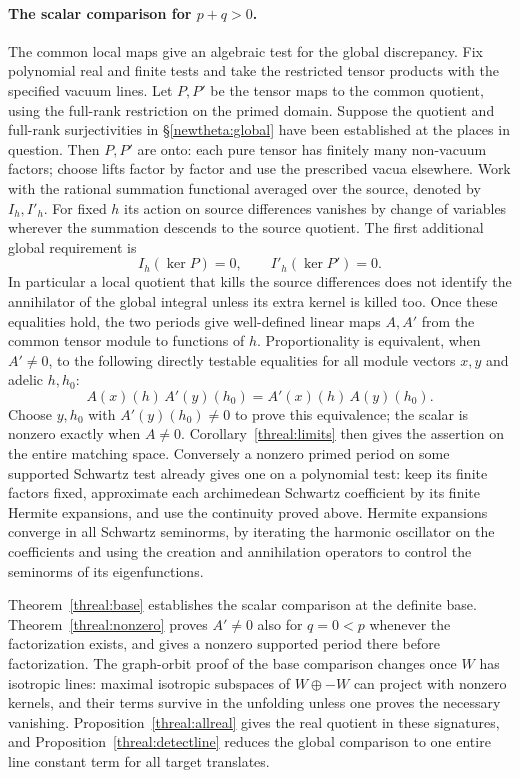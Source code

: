 \paragraph{The scalar comparison for \(p+q>0\).}
The common local maps give an algebraic test for the
global discrepancy. Fix polynomial real and finite tests and take the
restricted tensor products with the specified vacuum lines. Let
\(P,P'\) be the tensor maps to the common quotient, using the
full-rank restriction on the primed domain. Suppose the quotient
and full-rank surjectivities in \S\ref{newtheta:global} have been
established at the places in question. Then \(P,P'\) are onto:
each pure tensor has finitely many non-vacuum factors; choose lifts
factor by factor and use the prescribed vacua elsewhere. Work with
the rational summation functional averaged over the source, denoted
by \(I_h,I'_h\). For fixed \(h\) its action on source differences
vanishes by change of variables wherever the summation descends to
the source quotient. The first additional global requirement is
\[
            I_h(\ker P)=0,\qquad I'_h(\ker P')=0 .
\]
In particular a local quotient that kills the source differences
does not identify the annihilator of the global integral unless its
extra kernel is killed too. Once these equalities hold, the two
periods give well-defined linear maps \(A,A'\) from the common tensor
module to functions of \(h\). Proportionality is equivalent, when
\(A'\ne0\), to the following directly testable equalities for all
module vectors \(x,y\) and adelic \(h,h_0\):
\[
                   A(x)(h)\,A'(y)(h_0)
                    =A'(x)(h)\,A(y)(h_0).
\]
Choose \(y,h_0\) with \(A'(y)(h_0)\ne0\) to prove this equivalence;
the scalar is nonzero exactly when \(A\ne0\). Corollary~\ref{threal:limits}
then gives the assertion on the entire matching space. Conversely a
nonzero primed period on some supported Schwartz test already gives
one on a polynomial test: keep its finite factors fixed, approximate
each archimedean Schwartz coefficient by its finite Hermite
expansions, and use the continuity proved above. Hermite expansions
converge in all Schwartz seminorms, by iterating the harmonic
oscillator on the coefficients and using the creation and annihilation
operators to control the seminorms of its eigenfunctions.

Theorem~\ref{threal:base} establishes the scalar comparison at the
definite base. Theorem~\ref{threal:nonzero} proves \(A'\ne0\) also
for \(q=0<p\) whenever the factorization exists, and gives a nonzero
supported period there before factorization. The graph-orbit proof
of the base comparison changes once \(W\) has isotropic lines:
maximal isotropic subspaces of \(W\oplus -W\) can project with
nonzero kernels, and their terms survive in the unfolding unless
one proves the necessary vanishing. Proposition~\ref{threal:allreal}
gives the real quotient in these signatures, and
Proposition~\ref{threal:detectline} reduces the global comparison to
one entire line constant term for all target translates.

